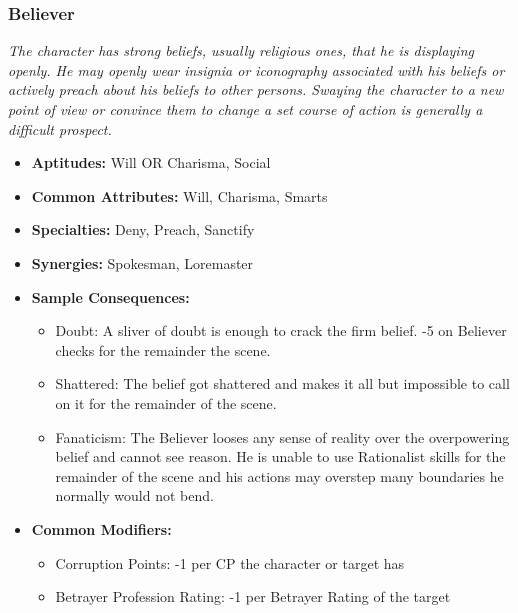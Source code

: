 \subsubsection{Believer}\label{Believer}
\textit{The character has strong beliefs, usually religious ones, that he is displaying openly.
He may openly wear insignia or iconography associated with his beliefs or actively preach about his beliefs to other persons.
Swaying the character to a new point of view or convince them to change a set course of action is generally a difficult prospect.}
\begin{itemize}
	\item \textbf{Aptitudes:} Will OR Charisma, Social
	\item \textbf{Common Attributes:} Will, Charisma, Smarts
	\item \textbf{Specialties:} Deny, Preach, Sanctify
	\item \textbf{Synergies:} Spokesman, Loremaster
	\item \textbf{Sample Consequences:} 
	\begin{itemize}
		\item Doubt: A sliver of doubt is enough to crack the firm belief. -5 on Believer checks for the remainder the scene.
		\item Shattered: The belief got shattered and makes it all but impossible to call on it for the remainder of the scene.
		\item Fanaticism: The Believer looses any sense of reality over the overpowering belief and cannot see reason. He is unable to use Rationalist skills for the remainder of the scene and his actions may overstep many boundaries he normally would not bend.
	\end{itemize}
	\item \textbf{Common Modifiers:}
	\begin{itemize}
		\item Corruption Points: -1 per CP the character or target has
		\item Betrayer Profession Rating: -1 per Betrayer Rating of the target
	\end{itemize}
\end{itemize}

